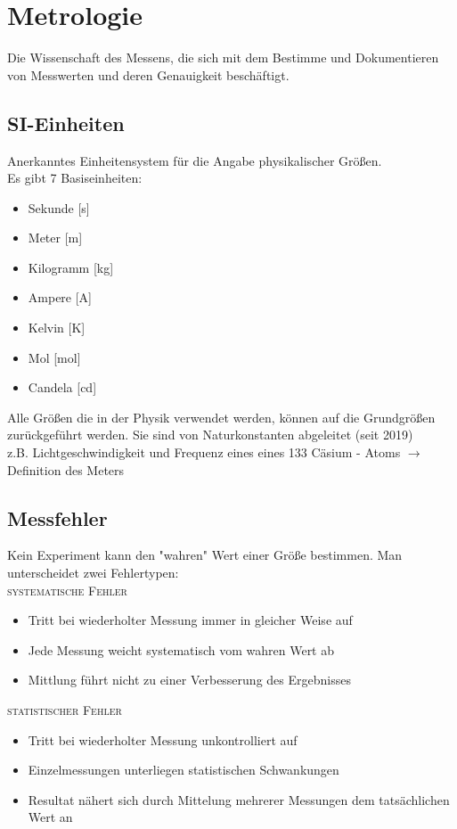 \documentclass[a4paper,12pt]{report}
\begin{document}
\section{Metrologie}

Die Wissenschaft des Messens, die sich mit dem Bestimme und Dokumentieren von Messwerten und deren Genauigkeit beschäftigt.

\subsection{SI-Einheiten}

Anerkanntes Einheitensystem für die Angabe physikalischer Größen.\\

Es gibt 7 Basiseinheiten:

\begin{itemize}
\item Sekunde [s]
\item Meter [m]
\item Kilogramm [kg]
\item Ampere [A]
\item Kelvin [K]
\item Mol [mol]
\item Candela [cd]
\end{itemize}

Alle Größen die in der Physik verwendet werden, können auf die Grundgrößen zurückgeführt werden. Sie sind von Naturkonstanten abgeleitet (seit 2019)\\
 z.B.  Lichtgeschwindigkeit und Frequenz eines   eines 133 Cäsium - Atoms $\rightarrow$  Definition des Meters


\subsection{Messfehler}

Kein Experiment kann den "wahren" Wert einer Größe bestimmen. Man unterscheidet zwei Fehlertypen: \\

\textsc{systematische Fehler}
\begin{itemize}
\item Tritt bei wiederholter Messung immer in gleicher Weise auf 
\item Jede Messung weicht systematisch vom wahren Wert ab 
\item Mittlung führt nicht zu einer Verbesserung des Ergebnisses 
\end{itemize}
\textsc{statistischer Fehler} 
\begin{itemize}
\item Tritt bei wiederholter Messung unkontrolliert auf 
\item Einzelmessungen unterliegen statistischen Schwankungen 
\item Resultat nähert sich durch Mittelung mehrerer Messungen dem tatsächlichen Wert an
\end{itemize}
\end{document}
